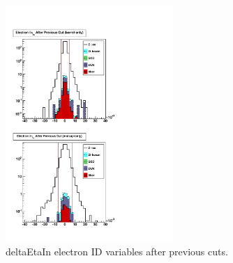  \begin{figure}[htb]
   \centering


   \includegraphics[width=180pt, angle=90]{Figures/dEtaInSeq-01Apr11.pdf}
  \caption[deltaEtaIn electron ID variables after previous cuts]{deltaEtaIn electron ID variables after previous cuts.}
\label{fig:dEtaInElecIdVars}
 \end{figure}




